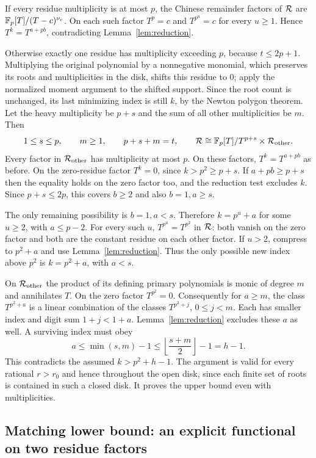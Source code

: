 \documentclass[11pt]{article}
\theoremstyle{remark}\newtheorem{remark}[theorem]{Remark}
\begin{document}
If every residue multiplicity is at most $p$, the Chinese remainder factors of $\mathcal R$
are $\mathbb F_p[T]/(T-c)^{\nu_c}$. On each such factor $T^p=c$ and $T^{p^u}=c$ for every
$u\ge1$. Hence $T^k=T^{a+pb}$, contradicting Lemma~\ref{lem:reduction}.

Otherwise exactly one residue has multiplicity exceeding $p$, because $t\le2p+1$.
Multiplying the original polynomial by a nonnegative monomial, which preserves its
roots and multiplicities in the disk, shifts this residue to $0$; apply the normalized
moment argument to the shifted support. Since the root count is unchanged, its last
minimizing index is still $k$, by the Newton polygon theorem. Let the heavy multiplicity be $p+s$ and the
sum of all other multiplicities be $m$. Then
\begin{equation}\label{eq:profile}
 1\le s\le p,\qquad m\ge1,\qquad p+s+m=t,
 \qquad \mathcal R\cong\mathbb F_p[T]/T^{p+s}\times\mathcal R_{\rm other}.
\end{equation}
Every factor in $\mathcal R_{\rm other}$ has multiplicity at most $p$. On these factors,
$T^k=T^{a+pb}$ as before. On the zero-residue factor $T^k=0$, since $k>p^2\ge p+s$.
If $a+pb\ge p+s$ then the equality holds on the zero factor too, and the reduction
test excludes $k$. Since $p+s\le2p$, this covers $b\ge2$ and also $b=1,a\ge s$.

The only remaining possibility is $b=1,a<s$. Therefore $k=p^u+a$ for some $u\ge2$,
with $a\le p-2$. For every such $u$, $T^{p^u}=T^{p^2}$ in $\mathcal R$: both vanish on the
zero factor and both are the constant residue on each other factor. If $u>2$,
compress to $p^2+a$ and use Lemma~\ref{lem:reduction}. Thus the only possible new
index above $p^2$ is $k=p^2+a$, with $a<s$.

On $\mathcal R_{\rm other}$ the product of its defining primary polynomials is monic of
degree $m$ and annihilates $T$. On the zero factor $T^{p^2}=0$. Consequently for
$a\ge m$, the class $T^{p^2+a}$ is a linear combination of the classes
$T^{p^2+j}$, $0\le j<m$. Each has smaller index and digit sum $1+j<1+a$.
Lemma~\ref{lem:reduction} excludes these $a$ as well. A surviving index must obey
\[
 a\le\min(s,m)-1\le\left\lfloor\frac{s+m}{2}\right\rfloor-1=h-1.
\]
This contradicts the assumed $k>p^2+h-1$. The argument is valid for every rational
$r>r_0$ and hence throughout the open disk, since each finite set of roots is contained
in such a closed disk. It proves the upper bound even with multiplicities.

\subsection{Matching lower bound: an explicit functional on two residue factors}
\end{document}
